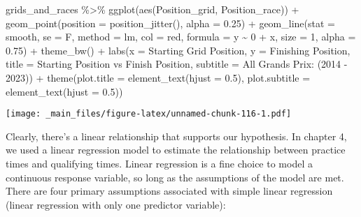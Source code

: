 \documentclass[
]{book}
\newenvironment{Shaded}{\begin{snugshade}}{\end{snugshade}}
\newcommand{\AttributeTok}[1]{\textcolor[rgb]{0.77,0.63,0.00}{#1}}
\newcommand{\DecValTok}[1]{\textcolor[rgb]{0.00,0.00,0.81}{#1}}
\newcommand{\FloatTok}[1]{\textcolor[rgb]{0.00,0.00,0.81}{#1}}
\newcommand{\FunctionTok}[1]{\textcolor[rgb]{0.00,0.00,0.00}{#1}}
\newcommand{\NormalTok}[1]{#1}
\newcommand{\SpecialCharTok}[1]{\textcolor[rgb]{0.00,0.00,0.00}{#1}}
\newcommand{\StringTok}[1]{\textcolor[rgb]{0.31,0.60,0.02}{#1}}
\begin{document}
\begin{Shaded}
\begin{Highlighting}[]
\NormalTok{grids\_and\_races }\SpecialCharTok{\%\textgreater{}\%}
  \FunctionTok{ggplot}\NormalTok{(}\FunctionTok{aes}\NormalTok{(Position\_grid, Position\_race)) }\SpecialCharTok{+}
  \FunctionTok{geom\_point}\NormalTok{(}\AttributeTok{position =} \FunctionTok{position\_jitter}\NormalTok{(), }\AttributeTok{alpha =} \FloatTok{0.25}\NormalTok{) }\SpecialCharTok{+}
  \FunctionTok{geom\_line}\NormalTok{(}\AttributeTok{stat =} \StringTok{\textquotesingle{}smooth\textquotesingle{}}\NormalTok{, }\AttributeTok{se =}\NormalTok{ F, }\AttributeTok{method =} \StringTok{\textquotesingle{}lm\textquotesingle{}}\NormalTok{, }\AttributeTok{col =} \StringTok{\textquotesingle{}red\textquotesingle{}}\NormalTok{,}
              \AttributeTok{formula =}\NormalTok{ y }\SpecialCharTok{\textasciitilde{}} \DecValTok{0} \SpecialCharTok{+}\NormalTok{ x, }\AttributeTok{size =} \DecValTok{1}\NormalTok{, }\AttributeTok{alpha =} \FloatTok{0.75}\NormalTok{) }\SpecialCharTok{+}
  \FunctionTok{theme\_bw}\NormalTok{() }\SpecialCharTok{+}
  \FunctionTok{labs}\NormalTok{(}\AttributeTok{x  =} \StringTok{\textquotesingle{}Starting Grid Position\textquotesingle{}}\NormalTok{,}
       \AttributeTok{y =} \StringTok{\textquotesingle{}Finishing Position\textquotesingle{}}\NormalTok{,}
       \AttributeTok{title =} \StringTok{\textquotesingle{}Starting Position vs Finish Position\textquotesingle{}}\NormalTok{,}
       \AttributeTok{subtitle =} \StringTok{\textquotesingle{}All Grands Prix: (2014 {-} 2023)\textquotesingle{}}\NormalTok{) }\SpecialCharTok{+}
  \FunctionTok{theme}\NormalTok{(}\AttributeTok{plot.title =} \FunctionTok{element\_text}\NormalTok{(}\AttributeTok{hjust =} \FloatTok{0.5}\NormalTok{),}
        \AttributeTok{plot.subtitle =} \FunctionTok{element\_text}\NormalTok{(}\AttributeTok{hjust =} \FloatTok{0.5}\NormalTok{))}
\end{Highlighting}
\end{Shaded}

\texttt{[image: \_main\_files/figure-latex/unnamed-chunk-116-1.pdf]}

Clearly, there's a linear relationship that supports our hypothesis. In chapter 4, we used a linear regression model to estimate the relationship between practice times and qualifying times. Linear regression is a fine choice to model a continuous response variable, so long as the assumptions of the model are met. There are four primary assumptions associated with simple linear regression (linear regression with only one predictor variable):
\end{document}
